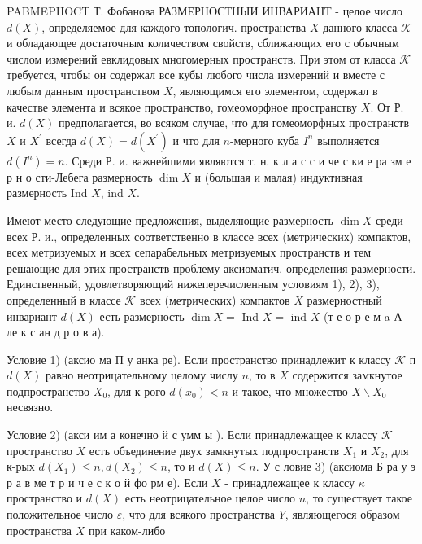 \documentclass[10pt]{article}
\begin{document}
PABMEPHOCT Т. Фобанова РАЗМЕРНОСТНЫИ ИНВАРИАНТ - целое число $d(X)$, определяемое для каждого топологич. пространства $X$ данного класса $\mathscr{K}$ и обладающее достаточным количеством свойств, сближающих его с обычным числом измерений евклидовых многомерных пространств. При этом от класса $\mathscr{K}$ требуется, чтобы он содержал все кубы любого числа измерений и вместе с любым данным пространством $X$, являющимся его элементом, содержал в качестве элемента и всякое пространство, гомеоморфное пространству $X$. От Р. и. $d(X)$ предполагается, во всяком случае, что для гомеоморфных пространств $X$ и $X^{\prime}$ всегда $d(X)=d\left(X^{\prime}\right)$ и что для $n$-мерного куба $I^{n}$ выполняется $d\left(I^{n}\right)=n$. Среди Р. и. важнейшими являются т. н. к л а с с и че с ки е ра зм е р н о сти-Лебега размерность $\operatorname{dim} X$ и (большая и малая) индуктивная размерность Ind $X$, ind $X$.



Имеют место следующие предложения, выделяющие размерность $\operatorname{dim} X$ среди всех Р. и., определенных соответственно в классе всех (метрических) компактов, всех метризуемых и всех сепарабельных метризуемых пространств и тем решающие для этих пространств проблему аксиоматич. определения размерности. Единственный, удовлетворяющий нижеперечисленным условиям 1), 2), 3), определенный в классе $\mathscr{K}$ всех (метрических) компактов $X$ размерностный инвариант $d(X)$ есть размерность $\operatorname{dim} X=$ Ind $X=$ ind $X$ (т е о р е м a А ле к с ан д р о в а).



Условие 1) (аксио ма П у анка ре). Если пространство принадлежит к классу $\mathscr{K}$ п $d(X)$ равно неотрицательному целому числу $n$, то в $X$ содержится замкнутое подпространство $X_{0}$, для к-рого $d\left(x_{0}\right)<n$ и такое, что множество $X \backslash X_{0}$ несвязно.



Условие 2) (акси им а конечно й с умм ы ). Если принадлежащее к классу $\mathscr{K}$ пространство $X$ есть объединение двух замкнутых подпространств $X_{1}$ и $X_{2}$, для к-рых $d\left(X_{1}\right) \leqslant n, d\left(X_{2}\right) \leqslant n$, то и $d(X) \leqslant n$. У с ловие 3) (аксиома Б ра у э р а в ме т р и ч е с к о й фо рм е). Если $X$ - принадлежащее к классу $\mathscr{\kappa}$ пространство и $d(X)$ есть неотрицательное целое число $n$, то существует такое положительное число $\varepsilon$, что для всякого пространства $Y$, являющегося образом пространства $X$ при каком-либо
\end{document}
